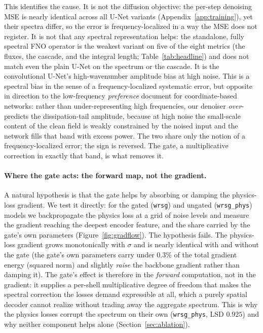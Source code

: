 \documentclass[10pt]{article} %
\begin{document}
This identifies the cause. It is not the diffusion objective: the per-step denoising MSE is nearly identical across all U-Net variants (Appendix~\ref{app:training}), yet their spectra differ, so the error is frequency-localized in a way the MSE does not register. It is not that any spectral representation helps: the standalone, fully spectral FNO operator is the weakest variant on five of the eight metrics (the fluxes, the cascade, and the integral length; Table~\ref{tab:headline}) and does not match even the plain U-Net on the spectrum or the cascade. It is the convolutional U-Net's high-wavenumber amplitude bias at high noise. This is a spectral bias in the sense of a frequency-localized systematic error, but opposite in direction to the low-frequency \emph{preference} \citet{rahaman2019spectral} document for coordinate-based networks: rather than under-representing high frequencies, our denoiser \emph{over}-predicts the dissipation-tail amplitude, because at high noise the small-scale content of the clean field is weakly constrained by the noised input and the network fills that band with excess power. The two share only the notion of a frequency-localized error; the sign is reversed. The gate, a multiplicative correction in exactly that band, is what removes it.

\paragraph{Where the gate acts: the forward map, not the gradient.} A natural hypothesis is that the gate helps by absorbing or damping the physics-loss gradient. We test it directly: for the gated (\texttt{wrsg}) and ungated (\texttt{wrsg\_phys}) models we backpropagate the physics loss at a grid of noise levels and measure the gradient reaching the deepest encoder feature, and the share carried by the gate's own parameters (Figure~\ref{fig:gradflow}). The hypothesis fails. The physics-loss gradient grows monotonically with $\sigma$ and is nearly identical with and without the gate (the gate's own parameters carry under $0.3\%$ of the total gradient energy (squared norm) and slightly \emph{raise} the backbone gradient rather than damping it). The gate's effect is therefore in the \emph{forward} computation, not in the gradient: it supplies a per-shell multiplicative degree of freedom that makes the spectral correction the losses demand expressible at all, which a purely spatial decoder cannot realize without trading away the aggregate spectrum. This is why the physics losses corrupt the spectrum on their own (\texttt{wrsg\_phys}, LSD $0.925$) and why neither component helps alone (Section~\ref{sec:ablation}).
\end{document}
